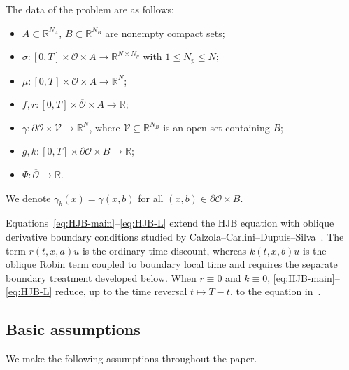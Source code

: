 \documentclass[10pt,a4paper]{amsart}
\newcommand{\R}{\mathbb{R}}
\newcommand{\cO}{\mathcal{O}}
\begin{document}
	The data of the problem are as follows:
	\begin{itemize}
		\item $A\subset\R^{N_A}$, $B\subset\R^{N_B}$ are nonempty compact sets;
		\item $\sigma:[0,T]\times\overline{\cO}\times A\to\R^{N\times N_p}$ with $1\le N_p\le N$;
		\item $\mu:[0,T]\times\overline{\cO}\times A\to\R^N$;
		\item $f,r:[0,T]\times\overline{\cO}\times A\to\R$;
		\item $\gamma:\partial\cO\times\mathcal{V}\to\R^N$, where $\mathcal{V}\subseteq\R^{N_B}$ is an open set containing $B$;
		\item $g,k:[0,T]\times\partial\cO\times B\to\R$;
		\item $\Psi:\overline{\cO}\to\R$.
	\end{itemize}
	We denote $\gamma_b(x)=\gamma(x,b)$ for all $(x,b)\in\partial\cO\times B$.
	
	Equations~\eqref{eq:HJB-main}--\eqref{eq:HJB-L} extend the HJB equation with oblique derivative boundary conditions studied by Calzola--Carlini--Dupuis--Silva~\cite{CalzolaEtAl2023}.  The term $r(t,x,a)u$ is the ordinary-time discount, whereas $k(t,x,b)u$ is the oblique Robin term coupled to boundary local time and requires the separate boundary treatment developed below.  When $r\equiv0$ and $k\equiv0$, \eqref{eq:HJB-main}--\eqref{eq:HJB-L} reduce, up to the time reversal $t\mapsto T-t$, to the equation in~\cite{CalzolaEtAl2023}.
	
	
	\subsection{Basic assumptions}
	
	We make the following assumptions throughout the paper.
	
\end{document}

